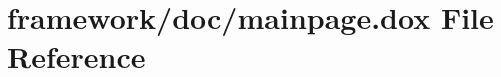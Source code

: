 \hypertarget{mainpage_8dox}{}\section{framework/doc/mainpage.dox File Reference}
\label{mainpage_8dox}
